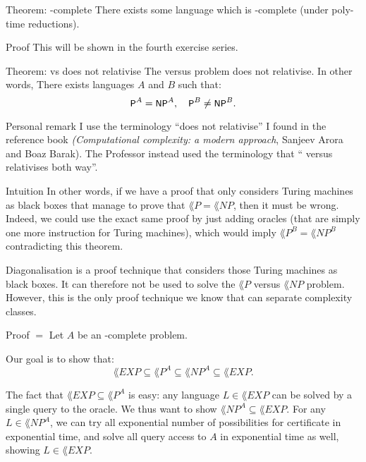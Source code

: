 \documentclass[a4paper]{article}
\begin{document}
\begin{parag}{Theorem: -complete}
    There exists some language which is -complete (under poly-time reductions).

    \begin{subparag}{Proof}
        This will be shown in the fourth exercise series.
    \end{subparag}
\end{parag}

\begin{parag}{Theorem:  vs  does not relativise}
    The  versus  problem does not relativise. In other words, There exists languages $A$ and $B$ such that: 
    \[\lang{P}^A = \lang{NP}^A, \mathspace \lang{P}^B \neq \lang{NP}^B.\]

    \begin{subparag}{Personal remark}
        I use the terminology ``does not relativise'' I found in the reference book \textit{(Computational complexity: a modern approach}, Sanjeev Arora and Boaz Barak). The Professor instead used the terminology that `` versus  relativises both way''. 
    \end{subparag}

    \begin{subparag}{Intuition}
        In other words, if we have a proof that only considers Turing machines as black boxes that manage to prove that $\lang{P} = \lang{NP}$, then it must be wrong. Indeed, we could use the exact same proof by just adding oracles (that are simply one more instruction for Turing machines), which would imply $\lang{P}^B = \lang{NP}^B$ contradicting this theorem.

        Diagonalisation is a proof technique that considers those Turing machines as black boxes. It can therefore not be used to solve the $\lang{P}$ versus $\lang{NP}$ problem. However, this is the only proof technique we know that can separate complexity classes.
    \end{subparag}

    \begin{subparag}{Proof $=$}
        Let $A$ be an -complete problem.

        Our goal is to show that: 
        \[\lang{EXP} \subseteq \lang{P}^A \subseteq \lang{NP}^A \subseteq \lang{EXP}.\]

        The fact that $\lang{EXP} \subseteq \lang{P}^A$ is easy: any language $L \in \lang{EXP}$ can be solved by a single query to the oracle. We thus want to show $\lang{NP}^A \subseteq \lang{EXP}$. For any $L \in \lang{NP}^A$, we can try all exponential number of possibilities for certificate in exponential time, and solve all query access to $A$ in exponential time as well, showing $L \in \lang{EXP}$.


\end{subparag}
\end{parag}
\end{document}
